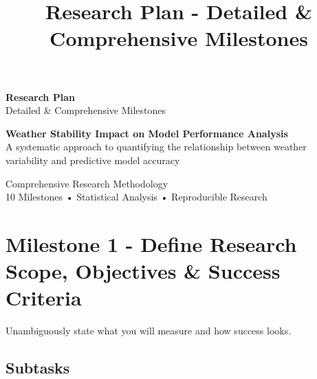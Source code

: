 \documentclass[11pt,a4paper]{article}
\title{\textbf{\color{primaryblue}Research Plan - Detailed \& Comprehensive Milestones}}
\author{}
\date{}
\begin{document}
\begin{titlepage}
\centering
\vspace*{2cm}

{\Huge\bfseries\color{primaryblue}Research Plan}\\[0.5cm]
{\Large\color{secondaryblue}Detailed \& Comprehensive Milestones}\\[2cm]

\begin{tcolorbox}[colback=lightgray,colframe=primaryblue,boxrule=2pt,arc=5pt,width=0.8\textwidth]
\centering
\large\textbf{Weather Stability Impact on Model Performance Analysis}\\[0.3cm]
\small A systematic approach to quantifying the relationship between weather variability and predictive model accuracy
\end{tcolorbox}

\vspace{2cm}

\vfill
{\large\color{darkgray}Comprehensive Research Methodology}\\[0.2cm]
{\small\color{darkgray}10 Milestones • Statistical Analysis • Reproducible Research}
\end{titlepage}

\newpage
\tableofcontents
\newpage

\section{Milestone 1 - Define Research Scope, Objectives \& Success Criteria}

\begin{objectivebox}
Unambiguously state what you will measure and how success looks.
\end{objectivebox}

\subsection{Subtasks}
\end{document}
